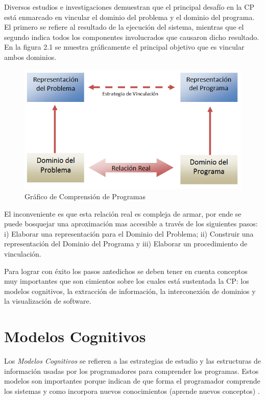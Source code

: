 \documentclass[a4paper,12pt]{report}
\begin{document}
Diversos estudios e investigaciones demuestran que el principal desafío en la CP está enmarcado en vincular el dominio del problema y el dominio del programa. El primero se refiere al resultado de la ejecución del sistema, mientras que el segundo indica todos los componentes involucrados que causaron dicho resultado. 
En la figura 2.1 se muestra gráficamente el principal objetivo que es vincular ambos dominios. 

\begin{figure}[h] %
\centering
\includegraphics[scale= 0.50]{./dom.png}
\caption{Gráfico de Comprensión de Programas}
\end{figure} \label{captura1}

El inconveniente es que esta relación real es compleja de armar, por ende se puede bosquejar una aproximación mas accesible a través de los siguientes pasos: i) Elaborar una representación para el Dominio del Problema; ii)
Construir una representación del Dominio del Programa y iii) Elaborar un procedimiento de vinculación.
 
Para lograr con éxito los pasos antedichos se deben tener en cuenta conceptos muy importantes que son cimientos sobre los cuales está sustentada la CP: los modelos cognitivos, la extracción de información, la interconexión de dominios y la visualización de software.

\section{Modelos Cognitivos}

Los \textit{Modelos Cognitivos} se refieren a las estrategias de estudio y las estructuras de información usadas por los programadores para comprender los programas. Estos modelos son importantes porque indican de que forma el programador comprende los sistemas y como incorpora nuevos conocimientos (aprende nuevos conceptos) \cite{MBPHRU10}.
\end{document}
